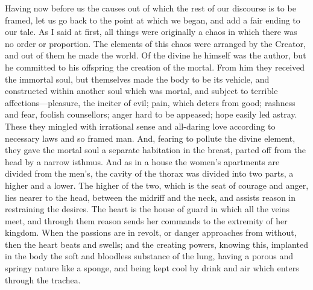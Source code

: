 \documentclass[11pt,letter]{article}
\begin{document}
\par  Having now before us the causes out of which the rest of our discourse is to be framed, let us go back to the point at which we began, and add a fair ending to our tale. As I said at first, all things were originally a chaos in which there was no order or proportion. The elements of this chaos were arranged by the Creator, and out of them he made the world. Of the divine he himself was the author, but he committed to his offspring the creation of the mortal. From him they received the immortal soul, but themselves made the body to be its vehicle, and constructed within another soul which was mortal, and subject to terrible affections—pleasure, the inciter of evil; pain, which deters from good; rashness and fear, foolish counsellors; anger hard to be appeased; hope easily led astray. These they mingled with irrational sense and all-daring love according to necessary laws and so framed man. And, fearing to pollute the divine element, they gave the mortal soul a separate habitation in the breast, parted off from the head by a narrow isthmus. And as in a house the women’s apartments are divided from the men’s, the cavity of the thorax was divided into two parts, a higher and a lower. The higher of the two, which is the seat of courage and anger, lies nearer to the head, between the midriff and the neck, and assists reason in restraining the desires. The heart is the house of guard in which all the veins meet, and through them reason sends her commands to the extremity of her kingdom. When the passions are in revolt, or danger approaches from without, then the heart beats and swells; and the creating powers, knowing this, implanted in the body the soft and bloodless substance of the lung, having a porous and springy nature like a sponge, and being kept cool by drink and air which enters through the trachea.
\end{document}
